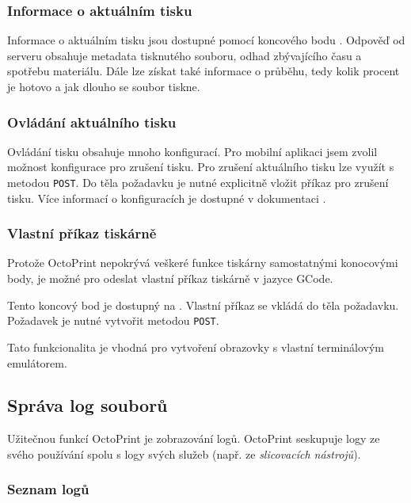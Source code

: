 \subsubsection*{Informace o aktuálním tisku}

Informace o aktuálním tisku jsou dostupné pomocí koncového bodu .
Odpověď od serveru obsahuje metadata tisknutého souboru, odhad zbývajícího času a spotřebu materiálu.
Dále lze získat také informace o průběhu, tedy kolik procent je hotovo a jak dlouho se soubor tiskne.

\subsubsection*{Ovládání aktuálního tisku}

Ovládání tisku obsahuje mnoho konfigurací.
Pro mobilní aplikaci jsem zvolil možnost konfigurace pro zrušení tisku.
Pro zrušení aktuálního tisku lze využít  s metodou \texttt{POST}.
Do těla požadavku je nutné explicitně vložit příkaz pro zrušení tisku.
Více informací o konfiguracích je dostupné v dokumentaci \cite{octoprint-docs-job}.

\subsubsection*{Vlastní příkaz tiskárně}

Protože OctoPrint nepokrývá veškeré funkce tiskárny samostatnými konocovými body, je možné pro odeslat vlastní příkaz tiskárně v jazyce GCode.

Tento koncový bod je dostupný na .
Vlastní příkaz se vkládá do těla požadavku.
Požadavek je nutné vytvořit metodou \texttt{POST}.

Tato funkcionalita je vhodná pro vytvoření obrazovky s vlastní terminálovým emulátorem.

\subsection{Správa log souborů}

Užitečnou funkcí OctoPrint je zobrazování logů.
OctoPrint seskupuje logy ze svého používání spolu s logy svých služeb (např. ze \textit{slicovacích nástrojů}).

\subsubsection*{Seznam logů}


